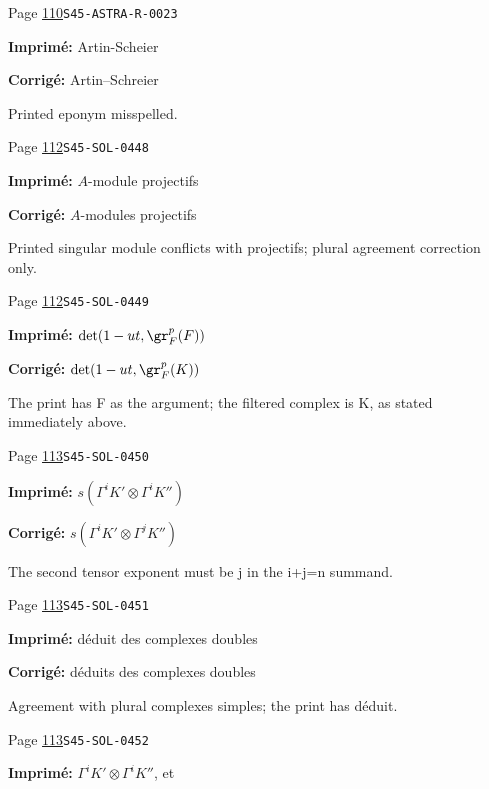 \begin{description}
\smallskip
\item[\hypertarget{apparatus:FR-0064}{64}] Page \hyperlink{printpage:fr:110}{110}\quad\texttt{S45-ASTRA-R-0023}
\par\noindent\textbf{Imprimé:} Artin-Scheier
\par\noindent\textbf{Corrigé:} Artin--Schreier
\par\noindent Printed eponym misspelled.
\smallskip
\item[\hypertarget{apparatus:FR-0065}{65}] Page \hyperlink{printpage:fr:112}{112}\quad\texttt{S45-SOL-0448}
\par\noindent\textbf{Imprimé:} $A$-module projectifs
\par\noindent\textbf{Corrigé:} $A$-modules projectifs
\par\noindent Printed singular module conflicts with projectifs; plural agreement correction only.
\smallskip
\item[\hypertarget{apparatus:FR-0066}{66}] Page \hyperlink{printpage:fr:112}{112}\quad\texttt{S45-SOL-0449}
\par\noindent\textbf{Imprimé:} \(\det(1-u t,\gr_F^p(F))\)
\par\noindent\textbf{Corrigé:} \(\det(1-u t,\gr_F^p(K))\)
\par\noindent The print has F as the argument; the filtered complex is K, as stated immediately above.
\smallskip
\item[\hypertarget{apparatus:FR-0067}{67}] Page \hyperlink{printpage:fr:113}{113}\quad\texttt{S45-SOL-0450}
\par\noindent\textbf{Imprimé:} \(s(\Gamma^i K'\otimes \Gamma^i K'')\)
\par\noindent\textbf{Corrigé:} \(s(\Gamma^i K'\otimes \Gamma^j K'')\)
\par\noindent The second tensor exponent must be j in the i+j=n summand.
\smallskip
\item[\hypertarget{apparatus:FR-0068}{68}] Page \hyperlink{printpage:fr:113}{113}\quad\texttt{S45-SOL-0451}
\par\noindent\textbf{Imprimé:} déduit des complexes doubles
\par\noindent\textbf{Corrigé:} déduits des complexes doubles
\par\noindent Agreement with plural complexes simples; the print has déduit.
\smallskip
\item[\hypertarget{apparatus:FR-0069}{69}] Page \hyperlink{printpage:fr:113}{113}\quad\texttt{S45-SOL-0452}
\par\noindent\textbf{Imprimé:} $\Gamma^i K'\otimes \Gamma^i K''$, et

\end{description}
